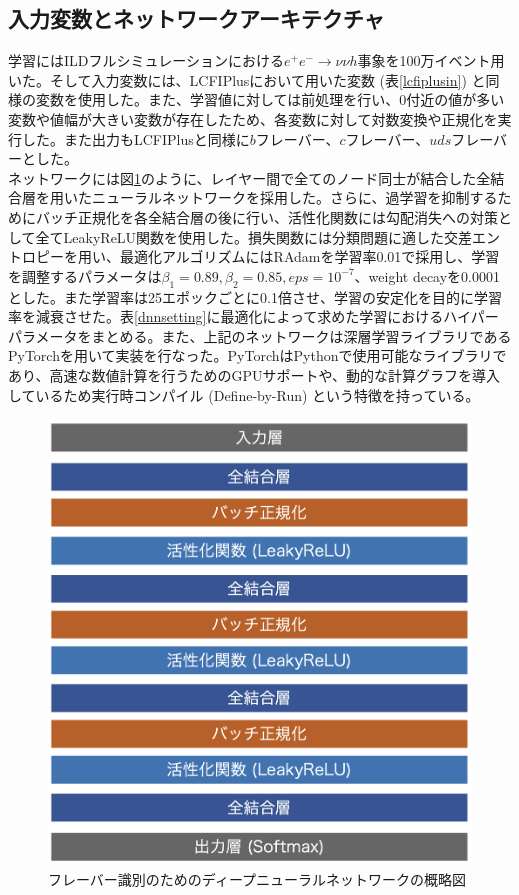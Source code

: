 \subsection{入力変数とネットワークアーキテクチャ}
学習にはILDフルシミュレーションにおける$e^+ e^- \rightarrow \nu\nu h$事象を100万イベント用いた。そして入力変数には、LCFIPlusにおいて用いた変数 (表\ref{lcfiplusin}) と同様の変数を使用した。また、学習値に対しては前処理を行い、0付近の値が多い変数や値幅が大きい変数が存在したため、各変数に対して対数変換や正規化を実行した。また出力もLCFIPlusと同様に$b$フレーバー、$c$フレーバー、$uds$フレーバーとした。\\
ネットワークには図\ref{dnnmodel}のように、レイヤー間で全てのノード同士が結合した全結合層を用いたニューラルネットワークを採用した。さらに、過学習を抑制するためにバッチ正規化を各全結合層の後に行い、活性化関数には勾配消失への対策として全てLeakyReLU関数を使用した。損失関数には分類問題に適した交差エントロピーを用い、最適化アルゴリズムにはRAdamを学習率0.01で採用し、学習を調整するパラメータは${\beta}_1 = 0.89, {\beta}_2 = 0.85, eps = 10^{-7}$、weight decayを0.0001とした。また学習率は25エポックごとに0.1倍させ、学習の安定化を目的に学習率を減衰させた。表\ref{dnnsetting}に最適化によって求めた学習におけるハイパーパラメータをまとめる。また、上記のネットワークは深層学習ライブラリであるPyTorchを用いて実装を行なった。PyTorchはPythonで使用可能なライブラリであり、高速な数値計算を行うためのGPUサポートや、動的な計算グラフを導入しているため実行時コンパイル (Define-by-Run) という特徴を持っている。
\begin{figure}[H]
	\begin{center}
 \includegraphics[keepaspectratio, scale=0.35]
 	{Figure/Flavortagging/dnn.png}
 		\caption{フレーバー識別のためのディープニューラルネットワークの概略図}
 		\label{dnnmodel}
	\end{center}
\end{figure}

